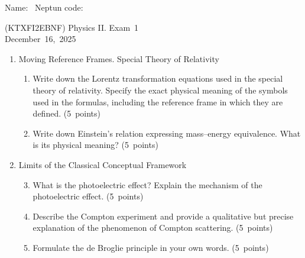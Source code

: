 \documentclass[a4paper,12pt]{letter}
\begin{document}
Name: \hrulefill\ Neptun code: \hrulefill

\bigskip

\begin{center}
(KTXFI2EBNF) Physics II. Exam~1 \\
December~16,~2025 
\end{center}

\bigskip
 
\begin{enumerate}[label=\Roman*.]
   
\item Moving Reference Frames. Special Theory of Relativity

\begin{enumerate}[label=\arabic*.]
\setcounter{enumii}{0} %


\item  Write down the Lorentz transformation equations used in the special theory of relativity. Specify the exact physical meaning of the symbols used in the formulas, including the reference frame in which they are defined. \hfill (5~points)
  
\item Write down Einstein’s relation expressing mass–energy equivalence. What is its physical meaning? \hfill (5~points)
 
\end{enumerate}


\item Limits of the Classical Conceptual Framework

\begin{enumerate}[label=\arabic*.]
\setcounter{enumii}{2} %
  
\item What is the photoelectric effect? Explain the mechanism of the photoelectric effect. \hfill (5~points)
  
\item Describe the Compton experiment and provide a qualitative but precise explanation of the phenomenon of Compton scattering. \hfill (5~points)

\item Formulate the de Broglie principle in your own words. \hfill (5~points)


\end{enumerate}
\end{enumerate}
\end{document}
